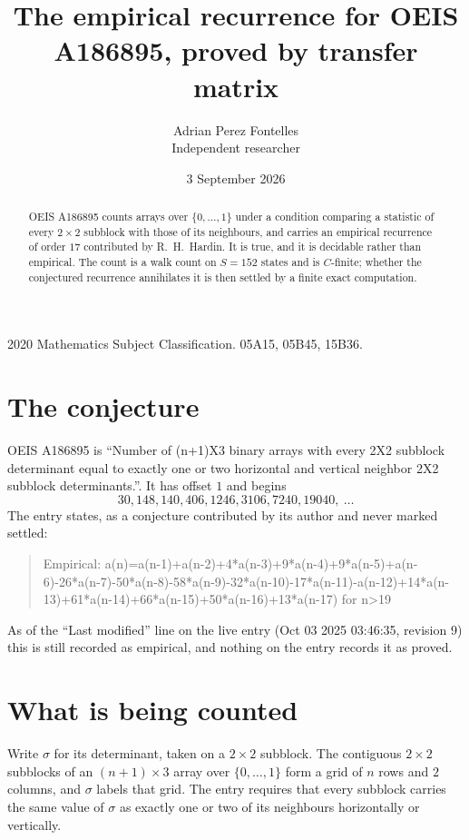 \documentclass[11pt,a4paper]{article}
\title{The empirical recurrence for OEIS A186895, proved by transfer matrix}
\author{Adrian Perez Fontelles\\ \small Independent researcher}
\date{3 September 2026}
\theoremstyle{plain}
\theoremstyle{definition}
\begin{document}
\maketitle

\begin{abstract}
OEIS A186895 counts arrays over $\{0,\dots,1\}$ under a condition comparing a statistic of
every $2\times2$ subblock with those of its neighbours, and carries an empirical recurrence
of order $17$ contributed by R.~H.~Hardin. It is true, and it is decidable rather than
empirical. The count is a walk count on $S=152$ states and is $C$-finite; whether the
conjectured recurrence annihilates it is then settled by a finite exact computation.
\end{abstract}

\noindent\small 2020 Mathematics Subject Classification. 05A15, 05B45, 15B36.\normalsize

\section{The conjecture}

OEIS A186895 is ``Number of (n+1)X3 binary arrays with every 2X2 subblock determinant equal to exactly one or two horizontal and vertical neighbor 2X2 subblock determinants.''. It has offset $1$ and begins
\[
30, 148, 140, 406, 1246, 3106, 7240, 19040,\ \dots
\]
The entry states, as a conjecture contributed by its author and never marked settled:
\begin{quote}
Empirical: a(n)=a(n-1)+a(n-2)+4*a(n-3)+9*a(n-4)+9*a(n-5)+a(n-6)-26*a(n-7)-50*a(n-8)-58*a(n-9)-32*a(n-10)-17*a(n-11)-a(n-12)+14*a(n-13)+61*a(n-14)+66*a(n-15)+50*a(n-16)+13*a(n-17) for n>19
\end{quote}
As of the ``Last modified'' line on the live entry (Oct 03 2025 03:46:35, revision 9) this is still
recorded as empirical, and nothing on the entry records it as proved.

\section{What is being counted}

Write $\sigma$ for its determinant, taken on a $2\times2$ subblock. The contiguous $2\times2$
subblocks of an $(n+1)\times3$ array over $\{0,\dots,1\}$ form a grid of $n$ rows
and $2$ columns, and $\sigma$ labels that grid. The entry
requires that every subblock carries the same value of $\sigma$ as exactly one or two of its neighbours horizontally or vertically.
\end{document}

